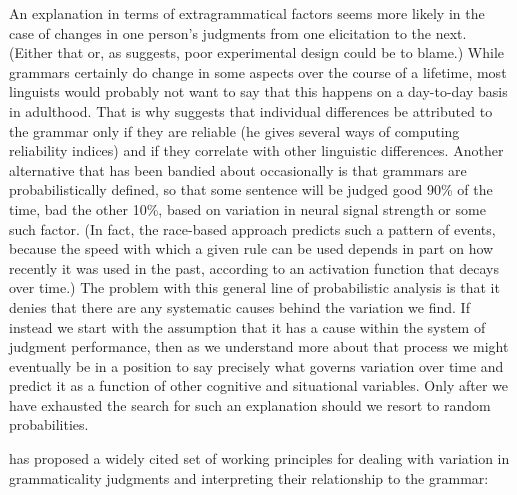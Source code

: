  An explanation in terms of extragrammatical factors seems more likely in the case of changes in one person's judgments from one elicitation to the next. (Either that or, as \citet{Snow1975} suggests, poor experimental design could be to blame.) While grammars certainly do change in some aspects over the course of a lifetime, most linguists would probably not want to say that this happens on a day-to-day basis in adulthood. That is why \citet{Carden1973} suggests that individual differences be attributed to the grammar only if they are reliable (he gives several ways of computing reliability indices) and if they correlate with other linguistic differences. Another alternative that has been bandied about occasionally is that grammars are probabilistically defined, so that some  sentence  will  be judged good 90\% of the time, bad the other 10\%, based on variation in neural signal strength or some such factor. (In fact, the race-based approach predicts such a pattern of events, because the speed with which a given rule can be used depends in part on how recently it was used in the past, according to an activation function that decays over time.) The problem with this general line of probabilistic  analysis is that it denies that there are any systematic causes behind the variation we find. If instead we start with the assumption that it has a cause within the system of judgment performance, then as we understand more about that process we might  eventually  be in a position  to say precisely  what  governs  variation  over
 time and predict it as a function of other cognitive and situational variables. Only after we have exhausted the search for such an explanation should we resort to random  probabilities.

 \citet{Labov1975} has proposed a widely cited set of working principles for dealing with variation in grammaticality judgments and interpreting their relationship to the grammar:

